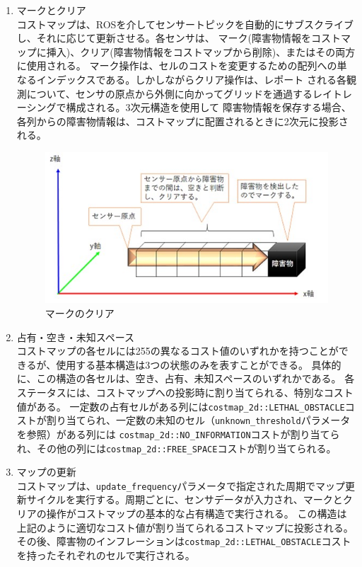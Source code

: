 \begin{enumerate}
  \item マークとクリア\\
  コストマップは、ROSを介してセンサートピックを自動的にサブスクライブし、それに応じて更新させる。各センサは、
  マーク(障害物情報をコストマップに挿入)、クリア(障害物情報をコストマップから削除)、またはその両方に使用される。
  マーク操作は、セルのコストを変更するための配列への単なるインデックスである。しかしながらクリア操作は、レポート
  される各観測について、センサの原点から外側に向かってグリッドを通過するレイトレーシングで構成される。3次元構造を使用して
  障害物情報を保存する場合、各列からの障害物情報は、コストマップに配置されるときに2次元に投影される。
  \begin{figure}[h]
    \begin{center}
      \includegraphics[width=.6\linewidth]{img/auto_40.jpg}
      \caption{マークのクリア}
      \label{auto:mark_clear}
    \end{center}
  \end{figure}
  \item 占有・空き・未知スペース\\
  コストマップの各セルには255の異なるコスト値のいずれかを持つことができるが、使用する基本構造は3つの状態のみを表すことができる。
  具体的に、この構造の各セルは、空き、占有、未知スペースのいずれかである。
  各ステータスには、コストマップへの投影時に割り当てられる、特別なコスト値がある。 
  一定数の占有セルがある列には\verb|costmap_2d::LETHAL_OBSTACLE|コストが割り当てられ、一定数の未知のセル（\verb|unknown_threshold|パラメータを参照）がある列には
  \verb|costmap_2d::NO_INFORMATION|コストが割り当てられ、その他の列には\verb|costmap_2d::FREE_SPACE|コストが割り当てられる。
  \item マップの更新\\
  コストマップは、\verb|update_frequency|パラメータで指定された周期でマップ更新サイクルを実行する。周期ごとに、センサデータが入力され、マークとクリアの操作がコストマップの基本的な占有構造で実行される。
  この構造は上記のように適切なコスト値が割り当てられるコストマップに投影される。その後、障害物のインフレーションは\verb|costmap_2d::LETHAL_OBSTACLE|コストを持ったそれぞれのセルで実行される。

\end{enumerate}
